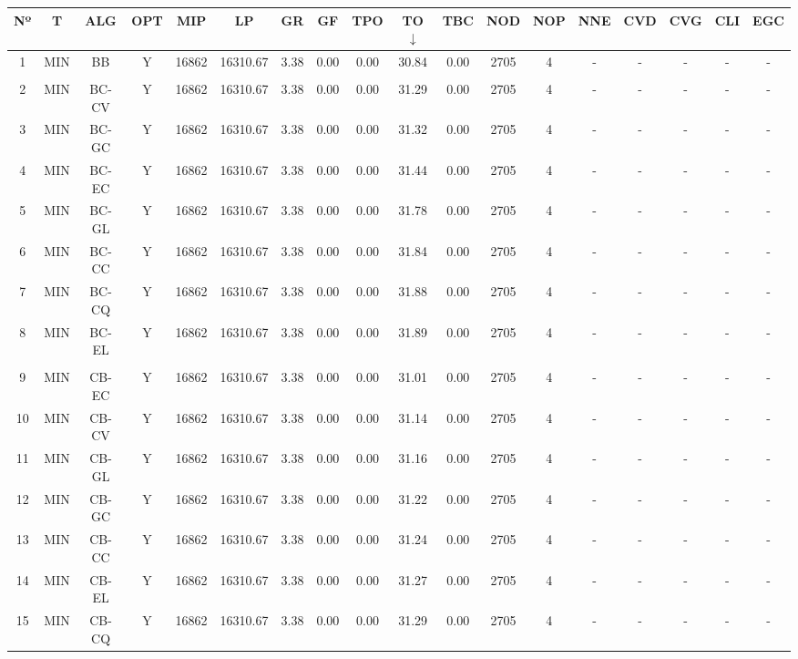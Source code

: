 {
\footnotesize\centering
\hspace*{-5mm}\begin{tabular}{ *{17}{c|} c }
\hline
\textbf{Nº} & \textbf{T} & \textbf{ALG} & \textbf{OPT} & \textbf{MIP} & \textbf{LP} & \textbf{GR} & \textbf{GF} & \textbf{TPO} & \textbf{TO} $\downarrow$ & \textbf{TBC} & \textbf{NOD} & \textbf{NOP} & \textbf{NNE} & \textbf{CVD} & \textbf{CVG} & \textbf{CLI} & \textbf{EGC}\\
\hline
1 & MIN & BB & Y & 16862 & 16310.67 & 3.38 & 0.00 & 0.00 & 30.84 & 0.00 & 2705 & 4 & - & - & - & - & -\\
\hline
\multicolumn{18}{c}{}
\\
\hline
2 & MIN & BC-CV & Y & 16862 & 16310.67 & 3.38 & 0.00 & 0.00 & 31.29 & 0.00 & 2705 & 4 & - & - & - & - & -\\
\hline
3 & MIN & BC-GC & Y & 16862 & 16310.67 & 3.38 & 0.00 & 0.00 & 31.32 & 0.00 & 2705 & 4 & - & - & - & - & -\\
\hline
4 & MIN & BC-EC & Y & 16862 & 16310.67 & 3.38 & 0.00 & 0.00 & 31.44 & 0.00 & 2705 & 4 & - & - & - & - & -\\
\hline
5 & MIN & BC-GL & Y & 16862 & 16310.67 & 3.38 & 0.00 & 0.00 & 31.78 & 0.00 & 2705 & 4 & - & - & - & - & -\\
\hline
6 & MIN & BC-CC & Y & 16862 & 16310.67 & 3.38 & 0.00 & 0.00 & 31.84 & 0.00 & 2705 & 4 & - & - & - & - & -\\
\hline
7 & MIN & BC-CQ & Y & 16862 & 16310.67 & 3.38 & 0.00 & 0.00 & 31.88 & 0.00 & 2705 & 4 & - & - & - & - & -\\
\hline
8 & MIN & BC-EL & Y & 16862 & 16310.67 & 3.38 & 0.00 & 0.00 & 31.89 & 0.00 & 2705 & 4 & - & - & - & - & -\\
\hline
\multicolumn{18}{c}{}
\\
\hline
9 & MIN & CB-EC & Y & 16862 & 16310.67 & 3.38 & 0.00 & 0.00 & 31.01 & 0.00 & 2705 & 4 & - & - & - & - & -\\
\hline
10 & MIN & CB-CV & Y & 16862 & 16310.67 & 3.38 & 0.00 & 0.00 & 31.14 & 0.00 & 2705 & 4 & - & - & - & - & -\\
\hline
11 & MIN & CB-GL & Y & 16862 & 16310.67 & 3.38 & 0.00 & 0.00 & 31.16 & 0.00 & 2705 & 4 & - & - & - & - & -\\
\hline
12 & MIN & CB-GC & Y & 16862 & 16310.67 & 3.38 & 0.00 & 0.00 & 31.22 & 0.00 & 2705 & 4 & - & - & - & - & -\\
\hline
13 & MIN & CB-CC & Y & 16862 & 16310.67 & 3.38 & 0.00 & 0.00 & 31.24 & 0.00 & 2705 & 4 & - & - & - & - & -\\
\hline
14 & MIN & CB-EL & Y & 16862 & 16310.67 & 3.38 & 0.00 & 0.00 & 31.27 & 0.00 & 2705 & 4 & - & - & - & - & -\\
\hline
15 & MIN & CB-CQ & Y & 16862 & 16310.67 & 3.38 & 0.00 & 0.00 & 31.29 & 0.00 & 2705 & 4 & - & - & - & - & -\\
\hline
\end{tabular}\\
\vspace{4mm}
}

